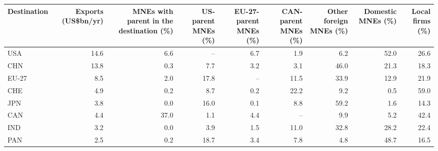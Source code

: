 \begin{tabular}{lrrrrrrrr}
\toprule
Destination & \multicolumn{1}{p{1.5cm}}{\raggedright Exports (US\$bn/yr)} & \multicolumn{1}{p{2.2cm}}{\raggedright MNEs with parent in the destination (\%)} & \multicolumn{1}{p{1.6cm}}{\raggedright US-parent MNEs (\%)} & \multicolumn{1}{p{1.6cm}}{\raggedright EU-27-parent MNEs (\%)} & \multicolumn{1}{p{1.6cm}}{\raggedright CAN-parent MNEs (\%)} & \multicolumn{1}{p{1.6cm}}{\raggedright Other foreign MNEs (\%)} & \multicolumn{1}{p{1.6cm}}{\raggedright Domestic MNEs (\%)} & \multicolumn{1}{p{1.5cm}}{\raggedright Local firms (\%)} \\
\midrule
USA & 14.6 & 6.6 & -- & 6.7 & 1.9 & 6.2 & 52.0 & 26.6 \\
CHN & 13.8 & 0.3 & 7.7 & 3.2 & 3.1 & 46.0 & 21.3 & 18.3 \\
EU-27 & 8.5 & 2.0 & 17.8 & -- & 11.5 & 33.9 & 12.9 & 21.9 \\
CHE & 4.9 & 0.2 & 8.7 & 0.2 & 22.2 & 9.2 & 0.5 & 59.0 \\
JPN & 3.8 & 0.0 & 16.0 & 0.1 & 8.8 & 59.2 & 1.6 & 14.3 \\
CAN & 4.4 & 37.0 & 1.1 & 4.4 & -- & 9.9 & 5.2 & 42.4 \\
IND & 3.2 & 0.0 & 3.9 & 1.5 & 11.0 & 32.8 & 28.2 & 22.4 \\
PAN & 2.5 & 0.2 & 18.7 & 3.4 & 7.8 & 4.8 & 48.7 & 16.5 \\
\bottomrule
\end{tabular}
